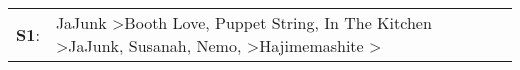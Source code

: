 \begin{supertabular}{p{0.03\textwidth}p{0.92\textwidth}}
 \textbf{S1}:  &  JaJunk\textsuperscript{} \textgreater \enspace Booth Love\textsuperscript{}, \enspace Puppet String\textsuperscript{}, \enspace In The Kitchen\textsuperscript{} \textgreater \enspace JaJunk\textsuperscript{}, \enspace Susanah\textsuperscript{}, \enspace Nemo\textsuperscript{}, \textsuperscript{} \textgreater \enspace Hajimemashite\textsuperscript{} \textgreater {}\textsuperscript{}  \enspace  \\
\end{supertabular}
